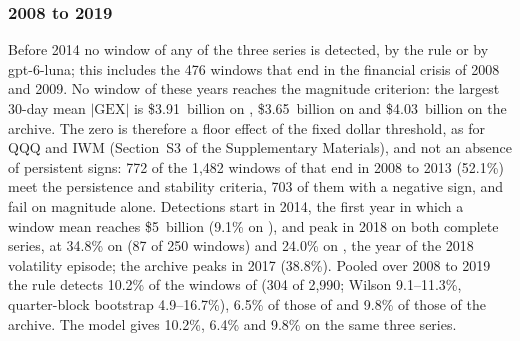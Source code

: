 \subsubsection{2008 to 2019}
\label{sec:results:deep}
Before 2014 no window of any of the three series is detected, by the rule or by gpt-6-luna; this includes the 476 windows that end in the financial crisis of 2008 and 2009. No window of these years reaches the magnitude criterion: the largest 30-day mean $|\mathrm{GEX}|$ is \$3.91~billion on , \$3.65~billion on  and \$4.03~billion on the archive. The zero is therefore a floor effect of the fixed dollar threshold, as for QQQ and IWM (Section~S3 of the Supplementary Materials), and not an absence of persistent signs: 772 of the 1{,}482 windows of  that end in 2008 to 2013 (52.1\%) meet the persistence and stability criteria, 703 of them with a negative sign, and fail on magnitude alone. Detections start in 2014, the first year in which a window mean reaches \$5~billion (9.1\% on ), and peak in 2018 on both complete series, at 34.8\% on  (87 of 250 windows) and 24.0\% on , the year of the 2018 volatility episode; the archive peaks in 2017 (38.8\%). Pooled over 2008 to 2019 the rule detects 10.2\% of the windows of  (304 of 2{,}990; Wilson 9.1--11.3\%, quarter-block bootstrap 4.9--16.7\%), 6.5\% of those of  and 9.8\% of those of the archive. The model gives 10.2\%, 6.4\% and 9.8\% on the same three series.

